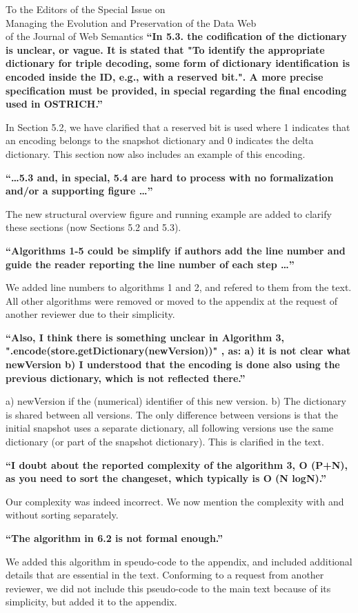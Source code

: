\documentclass{letter}
\newcounter{section}
\begin{document}
\begin{letter}{To the Editors of the Special Issue on\\Managing the Evolution and Preservation of the Data Web\\of the Journal of Web Semantics}
\textbf{\enquote{In 5.3. the codification of the dictionary is unclear, or vague. It is stated that "To identify the appropriate dictionary for triple decoding, some form of dictionary identification is encoded inside the ID, e.g., with a reserved bit.". A more precise specification must be provided, in special regarding the final encoding used in OSTRICH.}}

In Section 5.2, we have clarified that a reserved bit is used where 1 indicates that an encoding
belongs to the snapshot dictionary and 0 indicates the delta dictionary.
This section now also includes an example of this encoding.

\textbf{\enquote{\ldots 5.3 and, in special, 5.4 are hard to process with no formalization and/or a supporting figure \ldots}}

The new structural overview figure and running example are added to clarify these sections (now Sections 5.2 and 5.3).

\textbf{\enquote{Algorithms 1-5 could be simplify if authors add the line number and guide the reader reporting the line number of each step \ldots}}

We added line numbers to algorithms 1 and 2, and refered to them from the text.
All other algorithms were removed or moved to the appendix at the request of another reviewer due to their simplicity.

\textbf{\enquote{Also, I think there is something unclear in Algorithm 3, ".encode(store.getDictionary(newVersion))" , as: a) it is not clear what newVersion b) I understood that the encoding is done also using the previous dictionary, which is not reflected there.}}

a) newVersion if the (numerical) identifier of this new version.
b) The dictionary is shared between all versions. The only difference between versions is that the initial snapshot uses a separate dictionary, all following versions use the same dictionary (or part of the snapshot dictionary).
This is clarified in the text.

\textbf{\enquote{I doubt about the reported complexity of the algorithm 3, O (P+N), as you need to sort the changeset, which typically is O (N logN).}}

Our complexity was indeed incorrect. We now mention the complexity with and without sorting separately.

\textbf{\enquote{The algorithm in 6.2 is not formal enough.}}

We added this algorithm in speudo-code to the appendix,
and included additional details that are essential in the text.
Conforming to a request from another reviewer, we did not include this pseudo-code to the main text because of its simplicity,
but added it to the appendix.


\end{letter}
\end{document}
